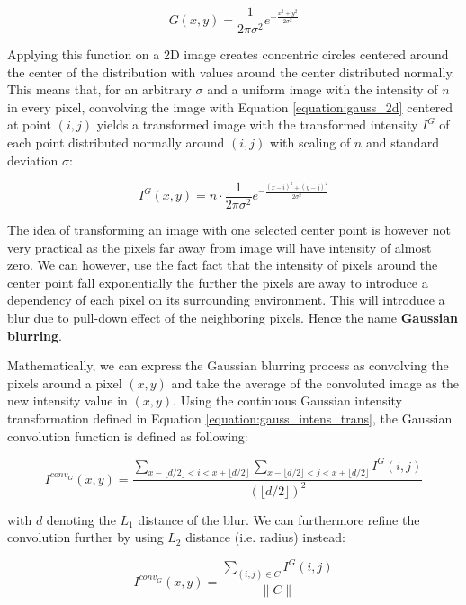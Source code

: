 \documentclass[pdftex,12pt,a4paper]{report}
\begin{document}
\begin{equation}
G(x,y) = \frac{1}{{2\pi \sigma^2}} e^{-\frac{x^2 + y^2}{2 \sigma^2}}
\label{equation:gauss_2d}
\end{equation}

Applying this function on a 2D image creates concentric circles centered around the center of the distribution with values around the center distributed normally. This means that, for an arbitrary $\sigma$  and a uniform image with the intensity of $n$ in every pixel,  convolving the image with Equation \ref{equation:gauss_2d} centered at point $(i, j)$ yields a transformed image with the transformed intensity $I^G$ of each point distributed normally around $(i, j)$ with scaling of $n$ and standard deviation $\sigma$:

\begin{equation}
I^G(x, y) = n \cdot \frac{1}{{2\pi \sigma^2}} e^{-\frac{(x - i)^2 + (y - j)^2}{2 \sigma^2}}
\label{equation:gauss_intens_trans}
\end{equation}

The idea of transforming an image with one selected center point is however not very practical as the pixels far away from image will have intensity of almost zero. We can however, use the fact fact that the intensity of pixels around the center point fall exponentially the further the pixels are away to introduce a dependency of each pixel on its surrounding environment. This will introduce a blur due to pull-down effect of the neighboring pixels. Hence the name \textbf{Gaussian blurring}.

Mathematically, we can express the Gaussian blurring process as convolving the pixels around a pixel $(x, y)$ and take the average of the convoluted image as the new intensity value in $(x, y)$. Using the continuous Gaussian intensity transformation defined in Equation \ref{equation:gauss_intens_trans}, the Gaussian convolution  function is defined as following:

$$
I^{conv_G}(x, y) = \frac{\sum_{x - \lfloor d/2 \rfloor < i < x + \lfloor d/2 \rfloor} \sum_{x - \lfloor d/2 \rfloor < j < x + \lfloor d/2 \rfloor} I^G(i, j)}{(\lfloor d/2 \rfloor)^2}
$$

with $d$ denoting the $L_1$ distance of the blur.  We can furthermore refine the convolution further by using $L_2$ distance (i.e. radius) instead:

\begin{equation}
I^{conv_G}(x, y) = \frac{\sum_{(i, j) \in C}  I^G(i, j)}{\| C \|}
\label{equation:conv_gaussian_cont}
\end{equation}
\end{document}
